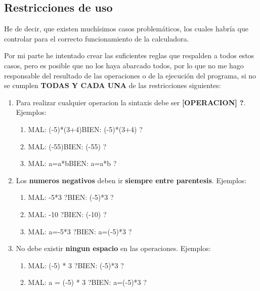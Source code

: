 \documentclass[12pt]{article}
\begin{document}
\subsection{Restricciones de uso}
He de decir, que existen muchísimos casos problemáticos, los cuales habría que controlar para el correcto funcionamiento de la calculadora. 

Por mi parte he intentado crear las suficientes reglas que respalden a todos estos casos, pero es posible que no los haya abarcado todos, por lo 
que no me hago responsable del resultado de las operaciones o de la ejecución del programa, si no se cumplen \textbf{TODAS Y CADA UNA} 
de las restricciones siguientes:
\begin{enumerate}
    \item Para realizar cualquier operacion la sintaxis debe ser \textbf{[OPERACION] ?}.\newline\newline
    Ejemplos:
        \begin{enumerate}
            \item MAL:  (-5)*(3+4)\hspace{1cm}BIEN:  (-5)*(3+4) ?
            \item MAL:  (-55)\hspace{2.05cm}BIEN:  (-55) ?
            \item MAL:  a=a*b\hspace{1.75cm}BIEN:  a=a*b ?\newline 
        \end{enumerate}
       
	\item Los \textbf{numeros negativos} deben ir \textbf{siempre entre parentesis}.\newline\newline
    Ejemplos:
        \begin{enumerate}
            \item MAL:  -5*3 ?\hspace{1.5cm}BIEN:  (-5)*3 ?
            \item MAL:  -10 ?\hspace{1.75cm}BIEN:  (-10) ?
            \item MAL:  a=-5*3 ?\hspace{1cm}BIEN:  a=(-5)*3 ?\newline
        \end{enumerate}
    
    \item No debe existir \textbf{ningun espacio} en las operaciones.\newline\newline
    Ejemplos:
        \begin{enumerate}
            \item MAL:  (-5) * 3 ?\hspace{2.3cm}BIEN:  (-5)*3 ?
            \item MAL:  a = (-5) * 3 ?\hspace{1.5cm}BIEN:  a=(-5)*3 ?\newline
        \end{enumerate}


\end{enumerate}
\end{document}

